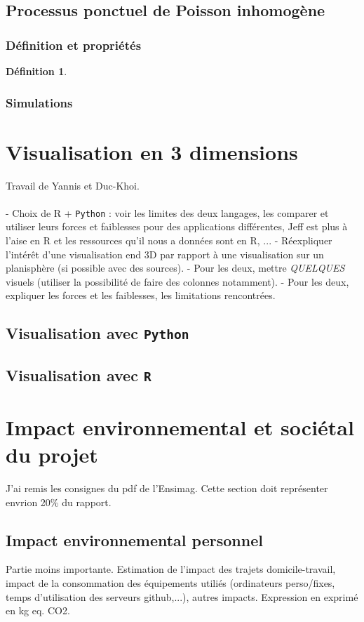 \documentclass[12pt]{article}
\newtheorem*{defin1}{Définition}
\begin{document}
\subsection{Processus ponctuel de Poisson inhomogène}
\subsubsection*{Définition et propriétés}

\begin{defin1}
\end{defin1}

\subsubsection*{Simulations}



\section{Visualisation en 3 dimensions}
Travail de Yannis et Duc-Khoi.\\
\\
- Choix de R + \texttt{Python} : voir les limites des deux langages, les comparer et utiliser leurs forces et faiblesses pour des applications différentes, Jeff est plus à l'aise en R et les ressources qu'il nous a données sont en R, ...
- Réexpliquer l'intérêt d'une visualisation end 3D par rapport à une visualisation sur un planisphère (si possible avec des sources).
- Pour les deux, mettre \textit{QUELQUES} visuels (utiliser la possibilité de faire des colonnes notamment).
- Pour les deux, expliquer les forces et les faiblesses, les limitations rencontrées.

\subsection{Visualisation avec \texttt{Python}}
\subsection{Visualisation avec \texttt{R}}

\section{Impact environnemental et sociétal du projet}
J'ai remis les consignes du pdf de l'Ensimag. Cette section doit représenter envrion 20\% du rapport.
\subsection*{Impact environnemental personnel}
Partie moins importante.
Estimation de l'impact des trajets domicile-travail, impact de la consommation des équipements utiliés (ordinateurs perso/fixes, temps d'utilisation des serveurs github,...), autres impacts.
Expression en exprimé en kg eq. CO2.
\end{document}
